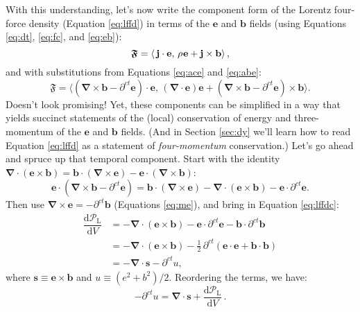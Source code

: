 \documentclass[12pt]{article}
\renewcommand{\vv}[1]{\mathbf{#1}}
\newcommand{\dd}[1]{\mathrm{d}#1}
\newcommand{\del}{\boldsymbol{\nabla}}
\begin{document}
With this understanding, let's now write the component form of the Lorentz four-force density (Equation \ref{eq:lffd}) in terms of the $\vv e$ and $\vv b$ fields (using Equations \ref{eq:dt}, \ref{eq:fc}, and \ref{eq:eb}):
\begin{equation*}
\bm{\mathfrak{F}} = \left \langle \, \vv j \cdot \vv e, \, \rho \mkern1mu \vv e + \vv j \times \vv b \right \rangle ,
\end{equation*}
and with substitutions from Equations \ref{eq:ace} and \ref{eq:abe}:
\begin{equation}\label{eq:lffdc2}
\bm{\mathfrak{F}} = \Big \langle \left( \del \times \vv b - \partial^{ct} \vv e \right) \cdot \vv e , \, \left( \del \cdot \vv e \right) \vv e + \left( \del \times \vv b - \partial^{ct} \vv e \right) \times \vv b \Big \rangle .
\end{equation}
Doesn't look promising! Yet, these components can be simplified in a way that yields succinct statements of the (local) conservation of energy and three-momentum of the $\vv e$ and $\vv b$ fields. (And in Section \ref{sec:dy} we'll learn how to read Equation \ref{eq:lffd} as a statement of \emph{four-momentum} conservation.) Let's go ahead and spruce up that temporal component. Start with the identity $\del \cdot (\vv e \times \vv b) = \vv b \cdot (\del \times \vv e) - \vv e \cdot (\del \times \vv b)$:
\begin{equation*}
\vv e \cdot \left( \del \times \vv b - \partial^{ct} \vv e \right) = \vv b \cdot \left( \del \times \vv e \right) - \del \cdot \left( \vv e \times \vv b \right) - \vv e \cdot \partial^{ct} \vv e .
\end{equation*}
Then use $\del \times \vv e = - \partial^{ct} \vv b$ (Equations \ref{eq:me}), and bring in Equation \ref{eq:lffdc}:
\begin{equation*}
\begin{split}
\dfrac{\dd \mathcal{P}_{\textrm{L}}}{\dd V} &= - \del \cdot \left( \vv e \times \vv b \right) - \vv e \cdot \partial^{ct} \vv e - \vv b \cdot \partial^{ct} \vv b  \\
&= - \del \cdot \left( \vv e \times \vv b \right) - \frac{1}{2} \, \partial^{ct} \left( \vv e \cdot \vv e + \vv b \cdot \vv b \right) \\[2pt]
&= - \del \cdot \vv s - \partial^{ct} u ,
\end{split}
\end{equation*}
where $\vv s \equiv \vv e \times \vv b$ and $u \equiv (e^2 + b^2)/2$. Reordering the terms, we have:
\begin{equation}\label{eq:py}
\boxed{ - \partial^{ct} u =  \del \cdot \vv s + \dfrac{\dd \mathcal{P}_{\textrm{L}}}{\dd V} } \, .
\end{equation}
\end{document}
